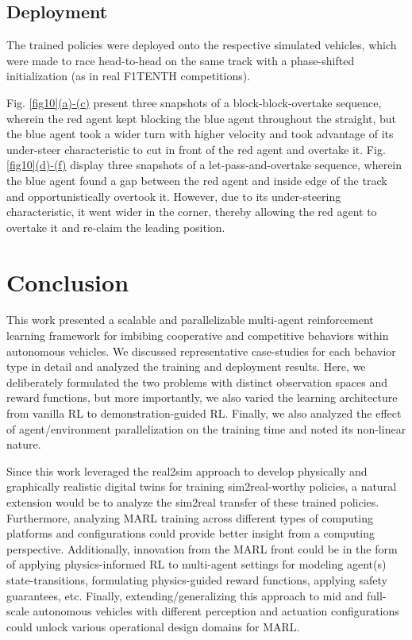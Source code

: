 \documentclass[letterpaper, 10 pt, conference]{ieeeconf}  %
\begin{document}
	\subsection{Deployment}
	\label{Sub-Section: Deployment II}
	
	The trained policies were deployed onto the respective simulated vehicles, which were made to race head-to-head on the same track with a phase-shifted initialization (as in real F1TENTH competitions).
	
	Fig. \hyperref[fig10]{\ref*{fig10}(a)-(c)} present three snapshots of a block-block-overtake sequence, wherein the red agent kept blocking the blue agent throughout the straight, but the blue agent took a wider turn with higher velocity and took advantage of its under-steer characteristic to cut in front of the red agent and overtake it. Fig. \hyperref[fig10]{\ref*{fig10}(d)-(f)} display three snapshots of a let-pass-and-overtake sequence, wherein the blue agent found a gap between the red agent and inside edge of the track and opportunistically overtook it. However, due to its under-steering characteristic, it went wider in the corner, thereby allowing the red agent to overtake it and re-claim the leading position.
	
	\section{Conclusion}
	\label{Section: Conclusion}
	
	This work presented a scalable and parallelizable multi-agent reinforcement learning framework for imbibing cooperative and competitive behaviors within autonomous vehicles. We discussed representative case-studies for each behavior type in detail and analyzed the training and deployment results. Here, we deliberately formulated the two problems with distinct observation spaces and reward functions, but more importantly, we also varied the learning architecture from vanilla RL to demonstration-guided RL. Finally, we also analyzed the effect of agent/environment parallelization on the training time and noted its non-linear nature.
	
	Since this work leveraged the real2sim approach to develop physically and graphically realistic digital twins for training sim2real-worthy policies, a natural extension would be to analyze the sim2real \cite{samak2023sim2real} transfer of these trained policies. Furthermore, analyzing MARL training across different types of computing platforms and configurations could provide better insight from a computing perspective. Additionally, innovation from the MARL front could be in the form of applying physics-informed RL to multi-agent settings for modeling agent(s) state-transitions, formulating physics-guided reward functions, applying safety guarantees, etc. Finally, extending/generalizing this approach to mid and full-scale autonomous vehicles with different perception and actuation configurations could unlock various operational design domains for MARL.
	
\end{document}
